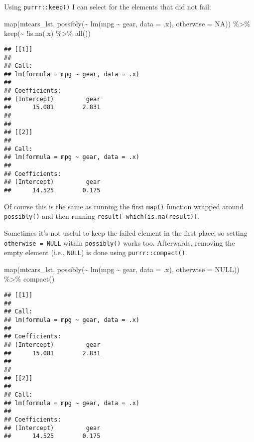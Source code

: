 \documentclass[
]{book}
\newenvironment{Shaded}{\begin{snugshade}}{\end{snugshade}}
\newcommand{\AttributeTok}[1]{\textcolor[rgb]{0.77,0.63,0.00}{#1}}
\newcommand{\ConstantTok}[1]{\textcolor[rgb]{0.00,0.00,0.00}{#1}}
\newcommand{\FunctionTok}[1]{\textcolor[rgb]{0.00,0.00,0.00}{#1}}
\newcommand{\NormalTok}[1]{#1}
\newcommand{\SpecialCharTok}[1]{\textcolor[rgb]{0.00,0.00,0.00}{#1}}
\begin{document}
Using \texttt{purrr::keep()} I can select for the elements that did not fail:

\begin{Shaded}
\begin{Highlighting}[]
\FunctionTok{map}\NormalTok{(mtcars\_lst, }\FunctionTok{possibly}\NormalTok{(}\SpecialCharTok{\textasciitilde{}} \FunctionTok{lm}\NormalTok{(mpg }\SpecialCharTok{\textasciitilde{}}\NormalTok{ gear, }\AttributeTok{data =}\NormalTok{ .x), }\AttributeTok{otherwise =} \ConstantTok{NA}\NormalTok{)) }\SpecialCharTok{\%\textgreater{}\%} 
  \FunctionTok{keep}\NormalTok{(}\SpecialCharTok{\textasciitilde{}} \SpecialCharTok{!}\FunctionTok{is.na}\NormalTok{(.x) }\SpecialCharTok{\%\textgreater{}\%} \FunctionTok{all}\NormalTok{())}
\end{Highlighting}
\end{Shaded}

\begin{verbatim}
## [[1]]
## 
## Call:
## lm(formula = mpg ~ gear, data = .x)
## 
## Coefficients:
## (Intercept)         gear  
##      15.081        2.831  
## 
## 
## [[2]]
## 
## Call:
## lm(formula = mpg ~ gear, data = .x)
## 
## Coefficients:
## (Intercept)         gear  
##      14.525        0.175
\end{verbatim}

Of course this is the same as running the first \texttt{map()} function wrapped around \texttt{possibly()} and then running \texttt{result{[}-which(is.na(result){]}}.

Sometimes it's not useful to keep the failed element in the first place, so setting \texttt{otherwise\ =\ NULL} within \texttt{possibly()} works too. Afterwards, removing the empty element (i.e., \texttt{NULL}) is done using \texttt{purrr::compact()}.

\begin{Shaded}
\begin{Highlighting}[]
\FunctionTok{map}\NormalTok{(mtcars\_lst, }\FunctionTok{possibly}\NormalTok{(}\SpecialCharTok{\textasciitilde{}} \FunctionTok{lm}\NormalTok{(mpg }\SpecialCharTok{\textasciitilde{}}\NormalTok{ gear, }\AttributeTok{data =}\NormalTok{ .x), }\AttributeTok{otherwise =} \ConstantTok{NULL}\NormalTok{)) }\SpecialCharTok{\%\textgreater{}\%}
  \FunctionTok{compact}\NormalTok{()}
\end{Highlighting}
\end{Shaded}

\begin{verbatim}
## [[1]]
## 
## Call:
## lm(formula = mpg ~ gear, data = .x)
## 
## Coefficients:
## (Intercept)         gear  
##      15.081        2.831  
## 
## 
## [[2]]
## 
## Call:
## lm(formula = mpg ~ gear, data = .x)
## 
## Coefficients:
## (Intercept)         gear  
##      14.525        0.175
\end{verbatim}
\end{document}

